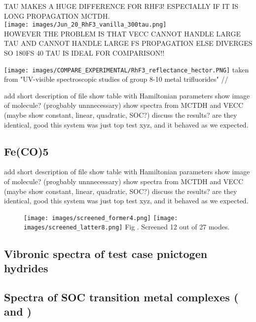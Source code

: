 TAU MAKES A HUGE DIFFERENCE FOR RHF3! ESPECIALLY IF IT IS LONG PROPAGATION MCTDH.\\
\texttt{[image: images/Jun\_20\_RhF3\_vanilla\_300tau.png]} \\

HOWEVER THE PROBLEM IS THAT VECC CANNOT HANDLE LARGE TAU AND CANNOT HANDLE LARGE FS PROPAGATION ELSE DIVERGES SO 180FS 40 TAU IS IDEAL FOR COMPARISON!!

\texttt{[image: images/COMPARE\_EXPERIMENTAL/RhF3\_reflectance\_hector.PNG]}
taken from "UV-visible spectroscopic studies of group 8-10 metal trifluorides" //


add short description of file
show table with Hamiltonian parameters
show image of molecule? (progbably unnnecessary)
show spectra from MCTDH and VECC (maybe show constant, linear, quadratic, SOC?)
discuss the results? are they identical, good this system was just top test xyz, and it behaved as we expected.

\subsection{Fe(CO)5}
add short description of file
show table with Hamiltonian parameters
show image of molecule? (progbably unnnecessary)
show spectra from MCTDH and VECC (maybe show constant, linear, quadratic, SOC?)
discuss the results? are they identical, good this system was just top test xyz, and it behaved as we expected.

\begin{figure}[!ht]
    \texttt{[image: images/screened\_former4.png]}
    \texttt{[image: images/screened\_latter8.png]}
    \center
    \small{Fig . Screened 12 out of 27 modes. }
\end{figure}

    

\subsection{Vibronic spectra of test case pnictogen hydrides}

\subsection{Spectra of  SOC transition metal complexes ( and )}

